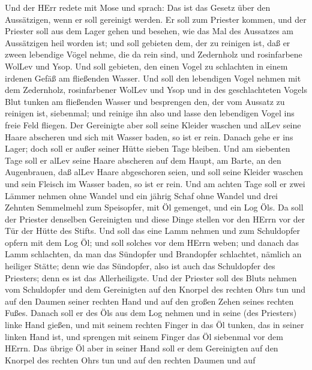  Und der HErr redete mit Mose und sprach:  Das
ist das Gesetz über den Aussätzigen, wenn er soll gereinigt werden. Er
soll zum Priester kommen,  und der Priester soll aus dem
Lager gehen und besehen, wie das Mal des Aussatzes am Aussätzigen heil
worden ist;  und soll gebieten dem, der zu reinigen ist, daß
er zween lebendige Vögel nehme, die da rein sind, und Zedernholz und
rosinfarbene WolLev und Ysop.  Und soll gebieten, den einen
Vogel zu schlachten in einem irdenen Gefäß am fließenden Wasser.
 Und soll den lebendigen Vogel nehmen mit dem Zedernholz,
rosinfarbener WolLev und Ysop und in des geschlachteten Vogels Blut
tunken am fließenden Wasser  und besprengen den, der vom
Aussatz zu reinigen ist, siebenmal; und reinige ihn also und lasse den
lebendigen Vogel ins freie Feld fliegen.  Der Gereinigte
aber soll seine Kleider waschen und alLev seine Haare abscheren und sich
mit Wasser baden, so ist er rein. Danach gehe er ins Lager; doch soll er
außer seiner Hütte sieben Tage bleiben.  Und am siebenten
Tage soll er alLev seine Haare abscheren auf dem Haupt, am Barte, an den
Augenbrauen, daß alLev Haare abgeschoren seien, und soll seine Kleider
waschen und sein Fleisch im Wasser baden, so ist er rein. 
Und am achten Tage soll er zwei Lämmer nehmen ohne Wandel und ein jährig
Schaf ohne Wandel und drei Zehnten Semmelmehl zum Speisopfer, mit Öl
gemenget, und ein Log Öls.  Da soll der Priester denselben
Gereinigten und diese Dinge stellen vor den HErrn vor der Tür der Hütte
des Stifts.  Und soll das eine Lamm nehmen und zum
Schuldopfer opfern mit dem Log Öl; und soll solches vor dem HErrn weben;
 und danach das Lamm schlachten, da man das Sündopfer und
Brandopfer schlachtet, nämlich an heiliger Stätte; denn wie das
Sündopfer, also ist auch das Schuldopfer des Priesters; denn es ist das
Allerheiligste.  Und der Priester soll des Bluts nehmen vom
Schuldopfer und dem Gereinigten auf den Knorpel des rechten Ohrs tun und
auf den Daumen seiner rechten Hand und auf den großen Zehen seines
rechten Fußes.  Danach soll er des Öls aus dem Log nehmen
und in seine (des Priesters) linke Hand gießen,  und mit
seinem rechten Finger in das Öl tunken, das in seiner linken Hand ist,
und sprengen mit seinem Finger das Öl siebenmal vor dem HErrn.
 Das übrige Öl aber in seiner Hand soll er dem Gereinigten
auf den Knorpel des rechten Ohrs tun und auf den rechten Daumen und auf

